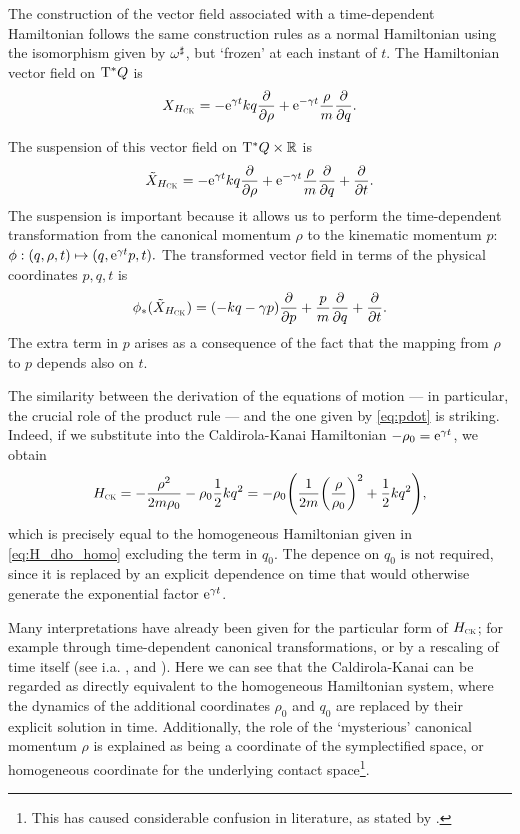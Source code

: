 The construction of the vector field associated with a time-dependent Hamiltonian follows the same construction rules as a normal Hamiltonian using the isomorphism given by \(\omega^\sharp\), but `frozen' at each instant of \(t\). The Hamiltonian vector field on \(\mathrm{T}^*Q\) is
\begin{equation}
     X_{H_\text{\tiny{\textsc{CK}}}} = -\mathrm{e}^{\gamma t}kq\pdv{}{\ensuremath{\rho}} + \mathrm{e}^{-\gamma t}\frac{\rho}{m}\pdv{}{q}.
\end{equation}

The suspension of this vector field on \(\mathrm{T}^*Q\times \mathbb{R}\) is
\begin{equation}
     \tilde{X}_{H_\text{\tiny{\textsc{CK}}}} = -\mathrm{e}^{\gamma t}kq\pdv{}{\ensuremath{\rho}} + \mathrm{e}^{-\gamma t}\frac{\rho}{m}\pdv{}{q} + \pdv{}{t}.
\end{equation}
The suspension is important because it allows us to perform the time-dependent transformation from the canonical momentum \(\rho\) to the kinematic momentum \(p\):
\(\phi: (q, \rho, t) \mapsto (q, \mathrm{e}^{\gamma t}p, t).\)
The transformed vector field in terms of the physical coordinates \(p, q, t\) is
\begin{equation}
     \phi_*(\tilde{X}_{H_\text{\tiny{\textsc{CK}}}}) = \qty(-kq - \gamma p)\pdv{}{p} + \frac{p}{m}\pdv{}{q} + \pdv{}{t}.
\end{equation}
The extra term in \(p\) arises as a consequence of the fact that the mapping from \(\rho\) to \(p\) depends also on \(t\). 

The similarity between the derivation of the equations of motion --- in particular, the crucial role of the product rule --- and the one given by \cref{eq:pdot} is striking. Indeed, if we substitute into the Caldirola-Kanai Hamiltonian \(-\rho_0 = \mathrm{e}^{\gamma t}\), we obtain
\begin{equation}
     H_\text{\tiny{\textsc{CK}}} = -\frac{\rho^2}{2m\rho_0} - \rho_0 \frac{1}{2}kq^2 = -\rho_0 \qty (\frac{1}{2m}\qty(\frac{\rho}{\rho_0})^2 + \frac{1}{2}kq^2),
\end{equation}
which is precisely equal to the homogeneous Hamiltonian given in \cref{eq:H_dho_homo} excluding the term in \(q_0\). The depence on \(q_0\) is not required, since it is replaced by an explicit dependence on time that would otherwise generate the exponential factor \(\mathrm{e}^{\gamma t}\). 

Many interpretations have already been given for the particular form of \(H_\text{\tiny{\textsc{CK}}}\); for example through time-dependent canonical transformations, or by a rescaling of time itself (see i.a. \citet{Tokieda2021}, \citet{Caldirola1941} and \citet{Bravetti2017}). Here we can see that the Caldirola-Kanai can be regarded as  directly equivalent to the homogeneous Hamiltonian system, where the dynamics of the additional coordinates \(\rho_0\) and \(q_0\) are replaced by their explicit solution in time. Additionally, the role of the `mysterious' canonical momentum \(\rho\) is explained as being a coordinate of the symplectified space, or homogeneous coordinate for the underlying contact space\footnote{This has caused considerable confusion in literature, as stated by \citet{Schuch1997}.}.

